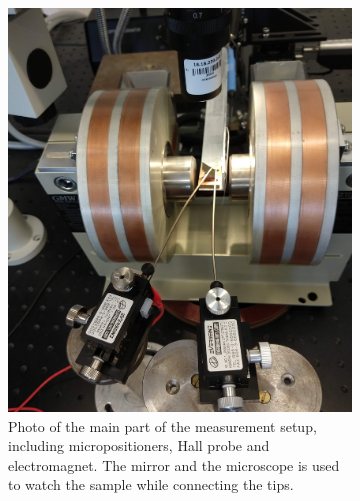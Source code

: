\begin{figure}[H]
    \centering
    \begin{subfigure}[t]{0.35\paperwidth}
    	\centering
    	\vskip 0pt
        \includegraphics[width=0.3\paperwidth]{img/05/SetupPhoto2.jpg}
        \caption{Photo of the main part of the measurement setup, including micropositioners, Hall probe and electromagnet. The mirror and the microscope is used to watch the sample while connecting the tips.}
        \label{ExperimentMeasurementPhotoa}
    \end{subfigure}
    ~ %
    \begin{subfigure}[t]{0.35\paperwidth}
    	\centering
    	\vskip 0pt

\end{subfigure}
\end{figure}
